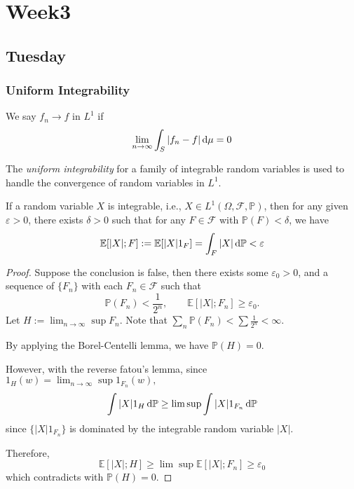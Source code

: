 
\chapter{Week3}

\section{Tuesday}

\subsection{Uniform Integrability}
\begin{definition}[$L_1$-convergence]
We say $f_n\to f$ in $L^1$ if
\[
\lim_{n\to\infty}\int_S|f_n-f|\,\mathrm{d}\mu=0
\]
\end{definition}

The \emph{uniform integrability} for a family of integrable random variables is used to handle the convergence of random variables in $L^1$.

\begin{proposition}\label{Pro:3:1}
If a random variable $X$ is integrable, i.e., $X\in L^1(\Omega,\mathcal{F},\mathbb{P})$, then for any given $\varepsilon>0$, there exists $\delta>0$ such that for any $F\in\mathcal{F}$ with $\mathbb{P}(F)<\delta$, we have
\[
\mathbb{E}[|X|;F]:=\mathbb{E}[|X|1_F]=\int_F|X|\,\mathrm{d}\mathbb{P}<\varepsilon
\]
\end{proposition}
\begin{proof}
Suppose the conclusion is false, then there exists some $\varepsilon_0>0$, and a sequence of $\{F_n\}$ with each $F_n\in\mathcal{F}$ such that
\[
\mathbb{P}(F_n)<\frac{1}{2^n},\qquad
\mathbb{E}[|X|;F_n]\ge\varepsilon_0.
\]
Let $H:=\lim_{n\to\infty}\sup F_n$. Note that $\sum_n\mathbb{P}(F_n)<\sum\frac{1}{2^n}<\infty$. 

By applying the Borel-Centelli lemma, we have $\mathbb{P}(H)=0$.

However, with the reverse fatou's lemma, since $1_H(w)=\lim_{n\to\infty}\sup 1_{F_n}(w),$
\[
\int|X|1_H\,\mathrm{d}\mathbb{P}\ge\lim\sup\int|X|1_{F_n}\,\mathrm{d}\mathbb{P}
\]
since $\{|X|1_{F_n}\}$ is dominated by the integrable random variable $|X|$.

Therefore,
\[
\mathbb{E}[|X|;H]\ge
\lim\sup\mathbb{E}[|X|;F_n]\ge\varepsilon_0
\]
which contradicts with $\mathbb{P}(H)=0$.
\end{proof}

